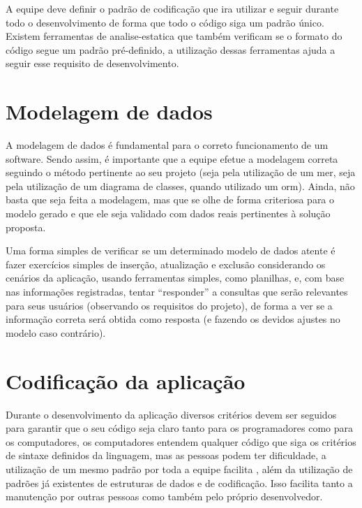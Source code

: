 A equipe deve definir o padrão de codificação que ira utilizar e seguir durante todo o desenvolvimento de forma que todo o código siga um padrão único. Existem ferramentas de \gls{analise-estatica} que também verificam se o formato do código segue um padrão pré-definido, a utilização dessas ferramentas ajuda a seguir esse requisito de desenvolvimento. 

\section{Modelagem de dados}\label{atv-modelagem-dados}
A modelagem de dados é fundamental para o correto funcionamento de um software. Sendo assim, é importante que a equipe efetue a modelagem correta seguindo o método pertinente ao seu projeto (seja pela utilização de um \ac{mer}, seja pela utilização de um diagrama de classes, quando utilizado um \ac{orm}). Ainda, não basta que seja feita a modelagem, mas que se olhe de forma criteriosa para o modelo gerado e que ele seja validado com dados reais pertinentes à solução proposta.

Uma forma simples de verificar se um determinado modelo de dados atente é fazer exercícios simples de inserção, atualização e exclusão considerando os cenários da aplicação, usando ferramentas simples, como planilhas, e, com base nas informações registradas, tentar \enquote{responder}  a consultas que serão relevantes para seus usuários (observando os requisitos do projeto), de forma a ver se a informação correta será obtida como resposta (e fazendo os devidos ajustes no modelo caso contrário).



\section{Codificação da aplicação}\label{atv-codificacao-aplicacao}

Durante o desenvolvimento da aplicação diversos critérios devem ser seguidos para garantir que o seu código seja claro tanto para os programadores como para os computadores, os computadores entendem qualquer código que siga os critérios de sintaxe definidos da linguagem, mas as pessoas podem ter dificuldade, a utilização de um mesmo padrão por toda a equipe facilita , além da utilização de padrões já existentes de estruturas de dados e de codificação. Isso facilita tanto a manutenção por outras pessoas como também pelo próprio desenvolvedor.

